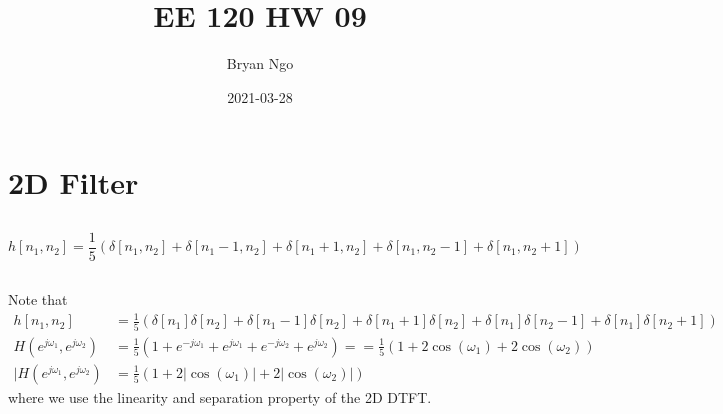 \documentclass{article}
\title{EE 120 HW 09}
\author{Bryan Ngo}
\date{2021-03-28}
\begin{document}
\maketitle

\section{2D Filter}

\subsection{}

\begin{equation}
    h[n_1, n_2] = \frac{1}{5} (\delta[n_1, n_2] + \delta[n_1 - 1, n_2] + \delta[n_1 + 1, n_2] + \delta[n_1, n_2 - 1] + \delta[n_1, n_2 + 1])
\end{equation}

\subsection{}

Note that
\begin{align}
    h[n_1, n_2] &= \frac{1}{5} (\delta[n_1] \delta[n_2] + \delta[n_1 - 1] \delta[n_2] + \delta[n_1 + 1] \delta[n_2] + \delta[n_1] \delta[n_2 - 1] + \delta[n_1] \delta[n_2 + 1]) \\
    H(e^{j \omega_1}, e^{j \omega_2}) &= \frac{1}{5} (1 + e^{-j \omega_1} + e^{j \omega_1} + e^{-j \omega_2} + e^{j \omega_2}) == \frac{1}{5} (1 + 2\cos(\omega_1) + 2\cos(\omega_2)) \\
    |H(e^{j \omega_1}, e^{j \omega_2}) &= \frac{1}{5} (1 + 2|\cos(\omega_1)| + 2|\cos(\omega_2)|)
\end{align}
where we use the linearity and separation property of the 2D DTFT.

\begin{center}
\end{center}
\end{document}
